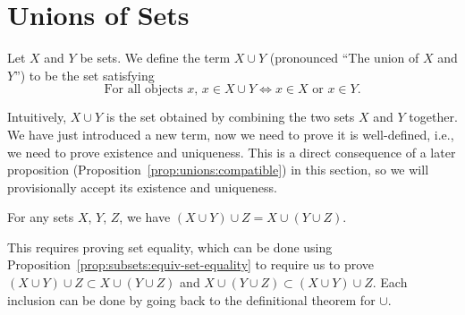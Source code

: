 \section{Unions of Sets}

\begin{definition}
Let $X$ and $Y$ be sets.
We define the term $X\cup Y$ (pronounced ``The union of $X$ and $Y$'')
to be the set satisfying
\begin{equation}\label{eq:def:unions:cup}
\mbox{For all objects $x$, }x\in X\cup Y\iff x\in X\mbox{ or }x\in Y.
\end{equation}
\end{definition}

Intuitively, $X\cup Y$ is the set obtained by combining the two sets $X$
and $Y$ together. We have just introduced a new term, now we need to
prove it is well-defined, i.e., we need to prove existence and
uniqueness. This is a direct consequence of a later proposition
(Proposition~\ref{prop:unions:compatible}) in this section, so we will
provisionally accept its existence and uniqueness.

\begin{theorem}
For any sets $X$, $Y$, $Z$, we have $(X\cup Y)\cup Z=X\cup(Y\cup Z)$.
\end{theorem}

This requires proving set equality, which can be done using
Proposition~\ref{prop:subsets:equiv-set-equality} to require us to prove
$(X\cup Y)\cup Z\subset X\cup(Y\cup Z)$ and $X\cup(Y\cup Z)\subset(X\cup Y)\cup Z$.
Each inclusion can be done by going back to the definitional theorem for
$\cup$.

